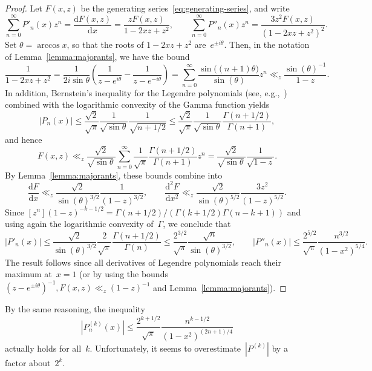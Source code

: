 \documentclass{siamart0216}
\begin{document}
\begin{proof}
Let $F(x, z)$ be the generating series~\eqref{eq:generating-series}, and write
\[
  \sum_{n=0}^{\infty} P'_n(x) z^n
  = \frac{\mathrm d F(x, z)}{\mathrm d x}
  = \frac{z F(x, z)}{1 - 2 x z + z^2},
  \qquad
  \sum_{n=0}^{\infty} P''_n(x) z^n
  = \frac{3 z^2 F(x, z)}{(1 - 2 x z + z^2)^2}.
\]
Set $\theta = \arccos x$, so that the roots of $1 - 2 x z + z^2$
are $e^{\pm i \theta}$.
Then, in the notation of Lemma~\ref{lemma:majorants}, we have the bound
\[ \frac{1}{1 - 2 x z + z^2}
   = \frac{1}{2 i \sin \theta} \left( \frac{1}{z - e^{i \theta}} -
                                      \frac{1}{z - e^{-i \theta}} \right)
   = \sum_{n=0}^{\infty} \frac{\sin\bigl((n+1) \theta\bigr)}{\sin(\theta)} z^n
   \ll_z \frac{\sin(\theta)^{-1}}{1 - z}. \]
In addition, Bernstein's inequality for the Legendre polynomials
(see, e.g.,~\cite{ChowGatteschiWong1994})
combined with the logarithmic convexity of the Gamma function yields
\[ |P_n(x)| \leq \frac{\sqrt{2}}{\sqrt{\pi}} \frac{1}{\sqrt{\sin \theta}}
                 \frac{1}{\sqrt{n+1/2}}
            \leq \frac{\sqrt 2}{\sqrt{\pi}} \frac{1}{\sqrt{\sin \theta}}
                 \frac{\Gamma(n+1/2)}{\Gamma(n+1)},
\]
and hence
\[ F(x, z) \ll_z \frac{\sqrt{2}}{\sqrt{\sin \theta}}
               \sum_{n=0}^{\infty} \frac{1}{\sqrt{\pi}}
                                  \frac{\Gamma(n+1/2)}{\Gamma(n+1)} z^n
            = \frac{\sqrt{2}}{\sqrt{\sin \theta}}
              \frac{1}{\sqrt{1-z}}. \]
By Lemma~\ref{lemma:majorants}, these bounds combine into
\[ \frac{\mathrm d F}{\mathrm d x}
   \ll_z \frac{\sqrt{2}}{\sin(\theta)^{3/2}} \frac{1}{(1-z)^{3/2}},
   \qquad
   \frac{\mathrm d^2 F}{\mathrm d x^2}
   \ll_z \frac{\sqrt{2}}{\sin(\theta)^{5/2}} \frac{3 z^2}{(1-z)^{5/2}}. \]
Since
$[z^n] (1 - z)^{- k - 1/2} = \Gamma(n + 1/2)/(\Gamma(k+1/2) \Gamma(n - k + 1))$
and using again the logarithmic convexity of~$\Gamma$, we conclude
that
\[ |P'_n(x)| \leq \frac{\sqrt{2}}{\sin(\theta)^{3/2}}
                  \frac{2}{\sqrt{\pi}} \frac{\Gamma(n+1/2)}{\Gamma(n)}
             \leq \frac{2^{3/2}}{\sqrt{\pi}} \frac{\sqrt n}{\sin(\theta)^{3/2}},
   \qquad
   |P''_n(x)| \leq \frac{2^{5/2}}{\sqrt{\pi}} \frac{n^{3/2}}{(1-x^2)^{5/4}}.
\]
The result follows since all derivatives of Legendre polynomials reach
their maximum at~$x=1$ (or by using the bounds
$(z - e^{\pm i \theta})^{-1}, F(x, z) \ll_z (1-z)^{-1}$
and Lemma~\ref{lemma:majorants}).
\end{proof}

\begin{remark}
By the same reasoning, the inequality
\[ |P^{(k)}_n(x)| \leq \frac{2^{k+1/2}}{\sqrt{\pi}}
                       \frac{n^{k-1/2}}{(1 - x^2)^{(2n+1)/4}} \]
actually holds for all~$k$. Unfortunately, it seems to
overestimate~$|P^{(k)}|$ by a factor about~$2^k$.
\end{remark}
\end{document}
